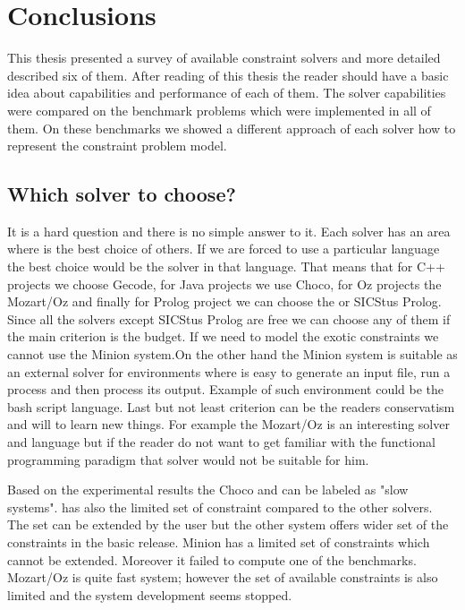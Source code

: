 \chapter{Conclusions}

This thesis presented a survey of available constraint solvers and more detailed 
described six of them. After reading of this thesis the reader should have a 
basic idea about capabilities and performance of each of them. The solver capabilities 
were compared on the benchmark problems which were implemented in all of them.
On these benchmarks we showed a different approach of each solver how to represent
the constraint problem model. 
 
\section{Which solver to choose?}
It is a hard question and there is no simple answer to it. Each solver has an area where
is the best choice of others. If we are forced to use a particular language the best choice
would be the solver in that language. That means that for C++ projects we choose Gecode,
for Java projects we use Choco, for Oz projects the Mozart/Oz and finally for Prolog
project we can choose the \eclipse or SICStus Prolog. Since all the solvers except SICStus Prolog are free
we can choose any of them if the main criterion is the budget. If we need to model the
exotic constraints we cannot use the Minion system.On the other hand the Minion system
is suitable as an external solver for environments where is easy to generate an input
file, run a process and then process its output. Example of such environment could
be the bash script language. Last but not least criterion can be the readers conservatism and 
will to learn new things. For example the Mozart/Oz is an interesting solver and language
but if the reader do not want to get familiar with the functional programming paradigm that solver would
not be suitable for him.

Based on the experimental results the Choco and \eclipse can be labeled as "slow systems".
\eclipse has also the limited set of constraint compared to the other solvers. The 
set can be extended by the user but the other system offers wider set of the 
constraints in the basic release. Minion has a limited set of constraints which 
cannot be extended. Moreover it failed to compute one of the benchmarks. Mozart/Oz
is quite fast system; however the set of available constraints is also limited and
the system development seems stopped.

